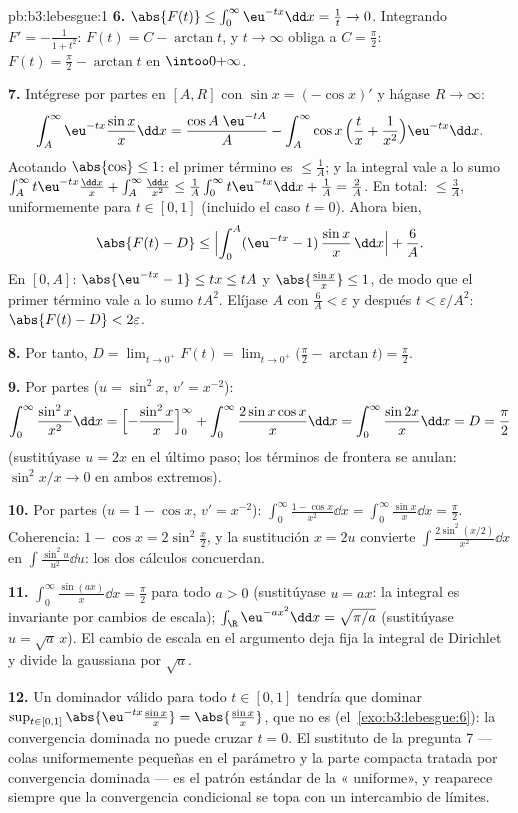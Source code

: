 \begin{solution}{pb:b3:lebesgue:1}
\textbf{6.} $\abs{F(t)} \leq \int_0^\infty\eu^{-tx}\dd x =
\frac1t \to 0$. Integrando $F' = -\frac1{1+t^2}$: $F(t) = C -
\arctan t$, y $t \to \infty$ obliga a $C = \frac\pi2$: $F(t) =
\frac\pi2 - \arctan t$ en $\intoo0{+\infty}$.

\textbf{7.} Intégrese por partes en $[A, R]$ con $\sin x =
(-\cos x)'$ y hágase $R \to \infty$:
\[
\int_A^{\infty}\eu^{-tx}\frac{\sin x}x\dd x
= \frac{\cos A\;\eu^{-tA}}{A}
- \int_A^\infty \cos x\,\Bigl(\frac tx +
\frac1{x^2}\Bigr)\eu^{-tx}\dd x .
\]
Acotando $\abs{\cos} \leq 1$: el primer término es $\leq \frac1A$; y la
integral vale a lo sumo $\int_A^\infty t\eu^{-tx}\frac{\dd x}x
+ \int_A^\infty\frac{\dd x}{x^2} \leq \frac1A\int_0^\infty
t\eu^{-tx}\dd x + \frac1A = \frac2A$. En total: $\leq \frac 3A$,
uniformemente para $t \in [0, 1]$ (incluido el caso $t = 0$). Ahora
bien,
\[
\abs{F(t) - D} \leq
\Bigl|\int_0^A(\eu^{-tx} - 1)\,\frac{\sin x}x\,\dd x\Bigr| +
\frac6A .
\]
En $[0, A]$: $\abs{\eu^{-tx} - 1} \leq tx \leq tA$ y
$\abs{\frac{\sin x}x} \leq 1$, de modo que el primer término vale a lo
sumo $tA^2$. Elíjase $A$ con $\frac6A < \varepsilon$ y después $t <
\varepsilon/A^2$: $\abs{F(t) - D} < 2\varepsilon$.

\textbf{8.} Por tanto, $D = \lim_{t\to0^+}F(t) =
\lim_{t\to0^+}\bigl(\frac\pi2 - \arctan t\bigr) =
\frac\pi2$.

\textbf{9.} Por partes ($u = \sin^2x$, $v' = x^{-2}$):
\[
\int_0^\infty\frac{\sin^2x}{x^2}\dd x
= \Bigl[-\frac{\sin^2x}{x}\Bigr]_0^\infty +
\int_0^\infty\frac{2\sin x\cos x}{x}\dd x
= \int_0^\infty\frac{\sin 2x}{x}\dd x = D = \frac\pi2
\]
(sustitúyase $u = 2x$ en el último paso; los términos de frontera se
anulan: $\sin^2 x/x \to 0$ en ambos extremos).

\textbf{10.} Por partes ($u = 1 - \cos x$, $v' = x^{-2}$):
$\int_0^\infty\frac{1 - \cos x}{x^2}\dd x =
\int_0^\infty\frac{\sin x}x\dd x = \frac\pi2$. Coherencia:
$1 - \cos x = 2\sin^2\frac x2$, y la sustitución $x = 2u$ convierte
$\int\frac{2\sin^2(x/2)}{x^2}\dd x$ en $\int\frac{\sin^2u}{u^2}\dd u$:
los dos cálculos concuerdan.

\textbf{11.} $\int_0^\infty\frac{\sin(ax)}x\dd x = \frac\pi2$
para todo $a > 0$ (sustitúyase $u = ax$: la integral es invariante por
cambios de escala); $\int_\R\eu^{-ax^2}\dd x = \sqrt{\pi/a}$
(sustitúyase $u = \sqrt a\,x$). El cambio de escala en el argumento deja
fija la integral de Dirichlet y divide la gaussiana por
$\sqrt a$.

\textbf{12.} Un dominador válido para todo $t \in [0,1]$ tendría que
dominar $\sup_{t\in[0,1]}\abs{\eu^{-tx}\frac{\sin
x}x} = \abs{\frac{\sin x}x}$, que no es
 (el~\cref{exo:b3:lebesgue:6}):
la convergencia dominada no puede cruzar $t = 0$. El sustituto de la
pregunta 7 --- colas uniformemente pequeñas en el parámetro y la parte
compacta tratada por convergencia
dominada --- es el patrón estándar de la
« uniforme», y reaparece
siempre que la convergencia condicional se topa con un intercambio de
límites.


\end{solution}
